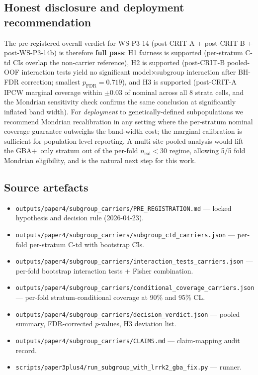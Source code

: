 \documentclass[11pt]{article}
\begin{document}
\subsection*{Honest disclosure and deployment recommendation}

The pre-registered overall verdict for WS-P3-14 (post-CRIT-A + post-CRIT-B + post-WS-P3-14b) is therefore \textbf{full pass}: H1 fairness is supported (per-stratum C-td CIs overlap the non-carrier reference), H2 is supported (post-CRIT-B pooled-OOF interaction tests yield no significant model$\times$subgroup interaction after BH-FDR correction; smallest $p_{\mathrm{FDR}}{=}0.719$), and H3 is supported (post-CRIT-A IPCW marginal coverage within $\pm0.03$ of nominal across all 8 strata cells, and the Mondrian sensitivity check confirms the same conclusion at significantly inflated band width). For \emph{deployment} to genetically-defined subpopulations we recommend Mondrian recalibration in any setting where the per-stratum nominal coverage guarantee outweighs the band-width cost; the marginal calibration is sufficient for population-level reporting. A multi-site pooled analysis would lift the GBA+~only stratum out of the per-fold $n_\mathrm{cal} < 30$ regime, allowing 5/5 fold Mondrian eligibility, and is the natural next step for this work.

\subsection*{Source artefacts}

\begin{itemize}\itemsep=0.2em
  \item \texttt{outputs/paper4/subgroup\_carriers/PRE\_REGISTRATION.md} — locked hypothesis and decision rule (2026-04-23).
  \item \texttt{outputs/paper4/subgroup\_carriers/subgroup\_ctd\_carriers.json} — per-fold per-stratum C-td with bootstrap CIs.
  \item \texttt{outputs/paper4/subgroup\_carriers/interaction\_tests\_carriers.json} — per-fold bootstrap interaction tests + Fisher combination.
  \item \texttt{outputs/paper4/subgroup\_carriers/conditional\_coverage\_carriers.json} — per-fold stratum-conditional coverage at 90\% and 95\% CL.
  \item \texttt{outputs/paper4/subgroup\_carriers/decision\_verdict.json} — pooled summary, FDR-corrected $p$-values, H3 deviation list.
  \item \texttt{outputs/paper4/subgroup\_carriers/CLAIMS.md} — claim-mapping audit record.
  \item \texttt{scripts/paper3plus4/run\_subgroup\_with\_lrrk2\_gba\_fix.py} — runner.
\end{itemize}
\end{document}
